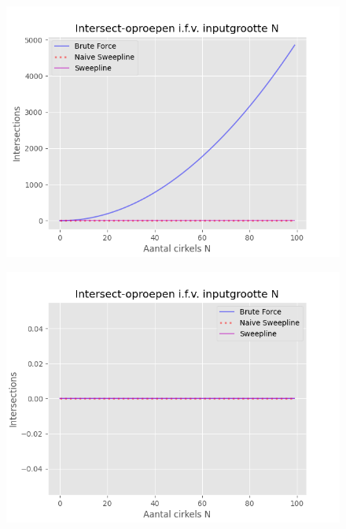 \documentclass[12pt]{article}
\begin{document}
\begin{figure}[H]
\centering
\begin{minipage}{.5\textwidth}
	\centering
	\includegraphics[width=\linewidth]{../plots/NaiveIntersections}
	\label{fig:NaiveIntersections}
\end{minipage}%
\begin{minipage}{.5\textwidth}
	\centering
	\includegraphics[width=\linewidth]{../plots/IntersectionsQuickReject}
	\label{fig:Intersections}
\end{minipage}
\end{figure}
\end{document}
